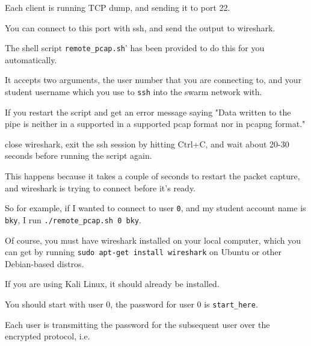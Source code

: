 {                    Each client is running TCP dump, and sending it to port 22. %



You can connect to this port with ssh, and send the output to wireshark.



                    The shell script \lstinline`remote_pcap.sh`' has been provided to do this for you automatically. 



                    It accepts two arguments, the user number that you are connecting to, and your student username which you use to \lstinline`ssh` into the swarm network with.



                    If you restart the script and get an error message saying "Data written to the pipe is neither in a supported in a supported pcap format nor in pcapng format."



                    close wireshark, exit the ssh session by hitting Ctrl+C, and wait about 20-30 seconds before running the script again.



                    This happens because it takes a couple of seconds to restart the packet capture, and wireshark is trying to connect before it's ready.







                    So for example, if I wanted to connect to user \lstinline`0`, and my student account name is \lstinline`bky`, I run \lstinline`./remote_pcap.sh 0 bky`. 



                    Of course, you must have wireshark installed on your local computer, which you can get by running \lstinline`sudo apt-get install wireshark` on Ubuntu or other Debian-based distros.



                    If you are using Kali Linux, it should already be installed.







                    You should start with user 0, the password for user 0 is \lstinline`start_here`. %



Each user is transmitting the password for the subsequent user over the encrypted protocol, i.e. %



}
